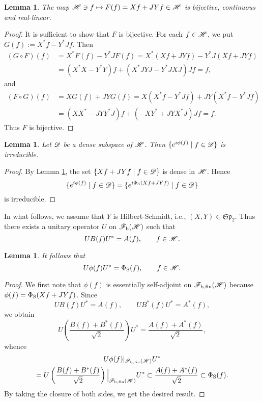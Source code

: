 \documentclass[12pt]{article}
\theoremstyle{plain}
\newtheorem{lem}[theorem]{\bf Lemma}
\numberwithin{equation}{section}
\theoremstyle{remark}
\begin{document}
\begin{lem}\label{bijective}
The map $\mathscr{H}\ni f\mapsto F(f)=Xf+JYf\in\mathscr{H}$ is bijective, continuous and real-linear.
\end{lem}

\begin{proof}
It is sufficient to show that $F$ is bijective.
For each $f\in\mathscr{H}$, we put $G(f):=X^*f-Y^*Jf$.
Then
\begin{align*}
(G\circ F)(f) &= X^*F(f)-Y^*JF(f) = X^*(Xf+JYf)-Y^*J(Xf+JYf)\\
&= (X^*X-Y^*Y)f + (X^*JYJ-Y^*JXJ)Jf=f,
\end{align*}
and
\begin{align*}
(F\circ G)(f) &= XG(f)+JYG(f) = X(X^*f-Y^*Jf)+JY(X^*f-Y^*Jf)\\
&= (XX^*-JYY^*J)f+(-XY^*+JYX^*J)Jf = f.
\end{align*}
Thus $F$ is bijective.
\end{proof}

\begin{lem}\label{irreducible}
Let $\mathscr{D} $ be a dense subspace of $\mathscr{H}$.
Then $\{e^{i\phi(f)}\mid f\in\mathscr{D} \}$ is irreducible.
\end{lem}

\begin{proof}
By Lemma \ref{bijective}, the set $\{Xf+JYf \mid f\in\mathscr{D} \}$ is dense in $\mathscr{H}$.
Hence
\[
\{e^{i\phi(f)}\mid f \in \mathscr{D} \} = \{e^{i\Phi_{\rm S}(Xf+JYf)}\mid f\in \mathscr{D} \}
\]
is irreducible.
\end{proof}

In what follows, we assume that $Y$ is Hilbert-Schmidt, i.e., $(X,Y)\in\mathfrak{Sp}_2$.
Thus there exists a unitary operator $U$ on $\mathscr{F}_\mathrm{b}(\mathscr{H})$ such that
\[
 UB(f)U^* = A(f), \qquad f\in\mathscr{H}.
\] 

\begin{lem}
It follows that
\[
 U\phi(f)U^* = \Phi_\mathrm{S}(f), \qquad f\in\mathscr{H}.
\]
\end{lem}

\begin{proof}
We first note that $\phi(f)$ is essentially self-adjoint on $\mathscr{F}_\mathrm{b,fin}(\mathscr{H})$ because $\phi(f)=\Phi_\mathrm{S}(Xf+JYf)$.
Since
\[
 UB(f)U^*=A(f), \qquad UB^*(f)U^*=A^*(f),
\]
we obtain
\[
 U \left( \frac{B(f)+B^*(f)}{\sqrt{2}}\right) U^* = \frac{A(f)+A^*(f)}{\sqrt{2}},
\]
whence
\begin{multline*}
 U\phi(f)|_{\mathscr{F}_\mathrm{b,fin}(\mathscr{H})}U^* \\
 = U\left(\frac{B(f)+B^*(f)}{\sqrt{2}}\right)\Big|_{\mathscr{F}_\mathrm{b,fin}(\mathscr{H})}U^*
   \subset \frac{A(f)+A^*(f)}{\sqrt{2}} \subset \Phi_\mathrm{S}(f).
\end{multline*}
By taking the closure of both sides, we get the desired result.
\end{proof}
\end{document}
